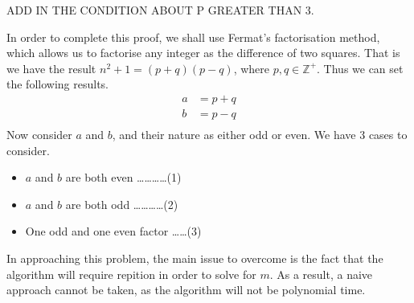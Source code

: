 		\bigbreak

		ADD IN THE CONDITION ABOUT P GREATER THAN 3.



In order to complete this proof, we shall use Fermat's factorisation method, which allows us to factorise any integer as the difference of two squares. That is we have the result $\displaystyle{n^2 + 1 = (p+q)(p-q)}$, where $\displaystyle{p,q \in \mathbb{Z}^+}$. Thus we can set the following results.
		\begin{align*}
		a & = p+q \\
		b & = p-q \\
		\end{align*}
		Now consider $\displaystyle{a}$ and $\displaystyle{b}$, and their nature as either odd or even. We have 3 cases to consider.
		\begin{itemize}
		\item $\displaystyle{a}$ and $\displaystyle{b}$ are both even \dots\dots\dots\dots (1)
		\item $\displaystyle{a}$ and $\displaystyle{b}$ are both odd \dots\dots\dots\dots (2)
		\item One odd and one even factor \dots\dots (3)
		\end{itemize}




In approaching this problem, the main issue to overcome is the fact that the algorithm will require repition in order to solve for $\displaystyle{m}$. As a result, a naive approach cannot be taken, as the algorithm will not be polynomial time.